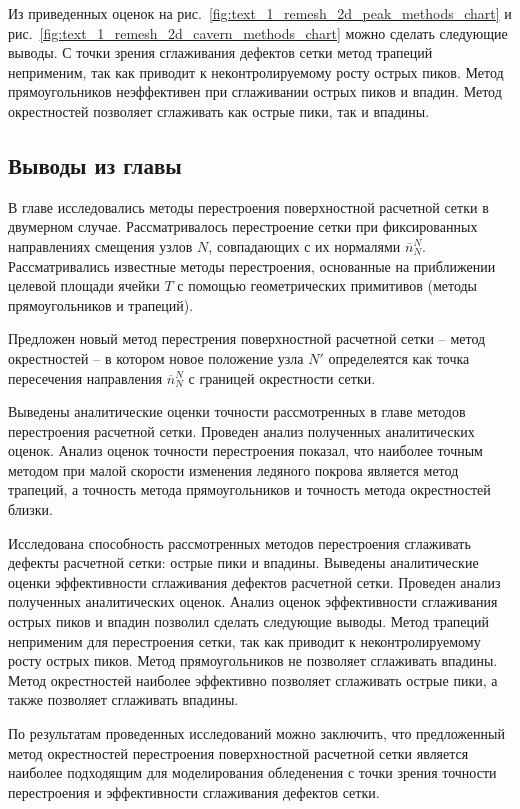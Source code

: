 Из приведенных оценок на рис.~\ref{fig:text_1_remesh_2d_peak_methods_chart} и рис.~\ref{fig:text_1_remesh_2d_cavern_methods_chart} можно сделать следующие выводы.
С точки зрения сглаживания дефектов сетки метод трапеций неприменим, так как приводит к неконтролируемому росту острых пиков.
Метод прямоугольников неэффективен при сглаживании острых пиков и впадин.
Метод окрестностей позволяет сглаживать как острые пики, так и впадины.


\subsection{Выводы из главы}

В главе исследовались методы перестроения поверхностной расчетной сетки в двумерном случае.
Рассматривалось перестроение сетки при фиксированных направлениях смещения узлов $N$, совпадающих с их нормалями $\overline{n}_{N}^N$.
Рассматривались известные методы перестроения, основанные на приближении целевой площади ячейки $T$ с помощью геометрических примитивов (методы прямоугольников и трапеций).

Предложен новый метод перестрения поверхностной расчетной сетки -- метод окрестностей -- в котором новое положение узла $N'$ определеятся как точка пересечения направления $\overline{n}_{N}^N$ с границей окрестности сетки.

Выведены аналитические оценки точности рассмотренных в главе методов перестроения расчетной сетки.
Проведен анализ полученных аналитических оценок.
Анализ оценок точности перестроения показал, что наиболее точным методом при малой скорости изменения ледяного покрова является метод трапеций, а точность метода прямоугольников и точность метода окрестностей близки.

Исследована способность рассмотренных методов перестроения сглаживать дефекты расчетной сетки: острые пики и впадины.
Выведены аналитические оценки эффективности сглаживания дефектов расчетной сетки.
Проведен анализ полученных аналитических оценок.
Анализ оценок эффективности сглаживания острых пиков и впадин позволил сделать следующие выводы.
Метод трапеций неприменим для перестроения сетки, так как приводит к неконтролируемому росту острых пиков.
Метод прямоугольников не позволяет сглаживать впадины.
Метод окрестностей наиболее эффективно позволяет сглаживать острые пики, а также позволяет сглаживать впадины.

По результатам проведенных исследований можно заключить, что предложенный метод окрестностей перестроения поверхностной расчетной сетки является наиболее подходящим для моделирования обледенения с точки зрения точности перестроения и эффективности сглаживания дефектов сетки.

